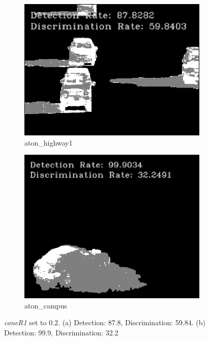 \begin{figure}
  \centering
  \begin{subfigure}{.49\linewidth}
    \includegraphics[width=1\linewidth]{figures/background/phys_highway1_200.png}
    \caption{aton\_highway1}
  \end{subfigure}
  \hfill
  \begin{subfigure}{.45\linewidth}
    \includegraphics[width=1\linewidth]{figures/background/phys_campus_200.png}
    \caption{aton\_campus}
  \end{subfigure}
  \caption{\textit{coneR1} set to $0.2$. (a) Detection: 87.8, Discrimination: 59.84. (b) Detection: 99.9, Discrimination: 32.2}
  \label{fig:coner102}
\end{figure}


